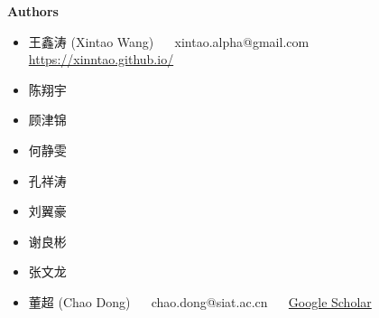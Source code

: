 \documentclass[../main.tex]{subfiles}
\begin{document}
\newpage

{\Large\textbf{Authors}}

\begin{itemize}
    \item 王鑫涛 (Xintao Wang) ~~ xintao.alpha@gmail.com ~~ \url{https://xinntao.github.io/}
    \item 陈翔宇
    \item 顾津锦
    \item 何静雯
    \item 孔祥涛
    \item 刘翼豪
    \item 谢良彬
    \item 张文龙
    \item 董超 (Chao Dong) ~~ chao.dong@siat.ac.cn ~~ \href{https://scholar.google.com.hk/citations?user=OSDCB0UAAAAJ}{Google Scholar}
\end{itemize}
\end{document}
